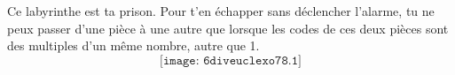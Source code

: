 Ce labyrinthe est ta prison. Pour t'en échapper sans déclencher
l'alarme, tu ne peux passer d'une pièce à une autre que lorsque les
codes de ces deux pièces sont des multiples d'un même nombre, autre
que 1.
\[\texttt{[image: 6diveuclexo78.1]}\]